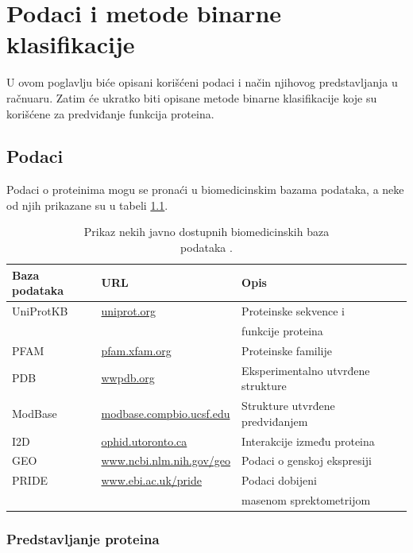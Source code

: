 \chapter{Podaci i metode binarne klasifikacije} %
\label{Chapter3}

U ovom poglavlju biće opisani korišćeni podaci i način njihovog predstavljanja u račnuaru. Zatim će ukratko biti opisane metode binarne klasifikacije koje su korišćene za predviđanje funkcija proteina.


\section{Podaci}

Podaci o proteinima mogu se pronaći u biomedicinskim bazama podataka, a neke od njih prikazane su u tabeli \ref{tab: databases}. 

\begin{table}[H]
	\centering
	\begin{tabular}{|l|l|l|}
		\hline
		Baza podataka & URL & Opis \\
		\hline
		UniProtKB & \url{uniprot.org} & Proteinske sekvence i \\ & & funkcije proteina \\
		\hline
		PFAM & \url{pfam.xfam.org} & Proteinske familije \\
		\hline
		PDB & \url{wwpdb.org} & Eksperimentalno utvrđene strukture \\
		\hline
		ModBase & \url{modbase.compbio.ucsf.edu} & Strukture utvrđene predviđanjem \\
		\hline
		I2D & \url{ophid.utoronto.ca} & Interakcije između proteina \\
		\hline
		GEO & \url{www.ncbi.nlm.nih.gov/geo} & Podaci o genskoj ekspresiji \\
		\hline
		PRIDE & \url{www.ebi.ac.uk/pride} & Podaci dobijeni \\
		& & masenom sprektometrijom \\
		\hline 
	\end{tabular}
	\caption{Prikaz nekih javno dostupnih biomedicinskih baza \\ podataka \cite{radivojac, doktJK}.}
	\label{tab: databases}
\end{table}



\subsection{Predstavljanje proteina}

